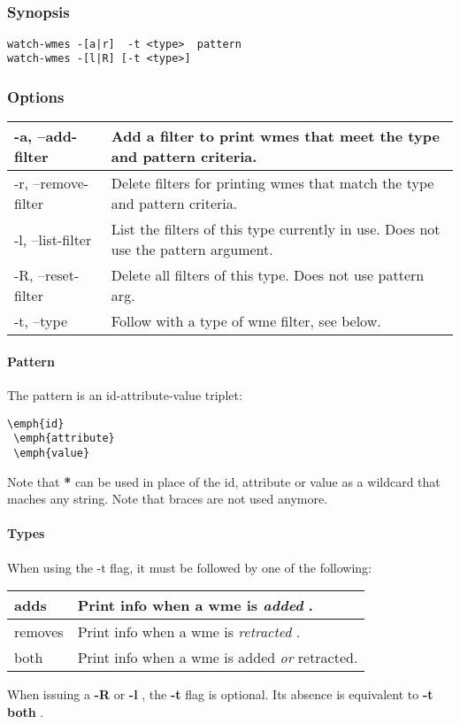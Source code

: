 \subsection{}
\label{watch-wmes}
\subsubsection*{Synopsis}
\begin{verbatim}
watch-wmes -[a|r]  -t <type>  pattern
watch-wmes -[l|R] [-t <type>]
\end{verbatim}
\subsubsection*{Options}
\begin{tabular}{|l|l|}
\hline 
 -a, --add-filter  & Add a filter to print wmes that meet the type and pattern criteria.  \\
 \hline 
 -r, --remove-filter  & Delete filters for printing wmes that match the type and pattern criteria.  \\
 \hline 
 -l, --list-filter  & List the filters of this type currently in use. Does not use the pattern argument.  \\
 \hline 
 -R, --reset-filter  & Delete all filters of this type. Does not use pattern arg.  \\
 \hline 
 -t, --type  & Follow with a type of wme filter, see below.  \\
 \hline 
\end{tabular}
\paragraph*{Pattern}
 The pattern is an id-attribute-value triplet: \begin{verbatim}
\emph{id}
 \emph{attribute}
 \emph{value}
\end{verbatim}
 Note that \textbf{*}
 can be used in place of the id, attribute or value as a wildcard that maches any string. Note that braces are not used anymore. 
\paragraph*{Types}
 When using the -t flag, it must be followed by one of the following: 
\begin{tabular}{|l|l|}
\hline 
 adds  & Print info when a wme is \emph{added}
.  \\
 \hline 
 removes  & Print info when a wme is \emph{retracted}
.  \\
 \hline 
 both  & Print info when a wme is added \emph{or}
 retracted.  \\
 \hline 
\end{tabular}
 When issuing a \textbf{-R}
 or \textbf{-l}
, the \textbf{-t}
 flag is optional. Its absence is equivalent to \textbf{-t both}
. 
